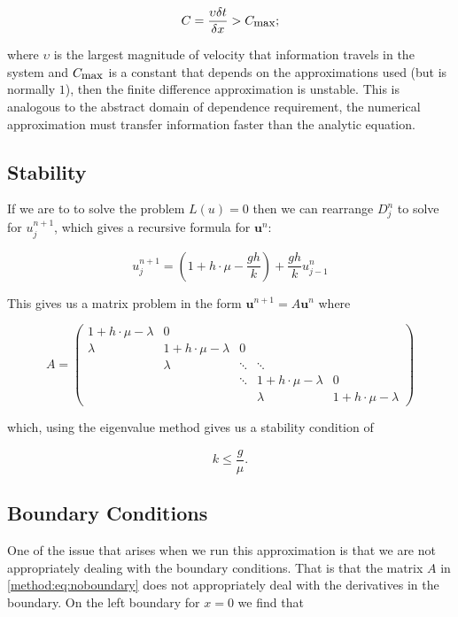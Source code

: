 \documentclass[../main]{subfiles}
\begin{document}
  \begin{equation}
    C = \frac{\upsilon \delta t}{\delta x} > C_{\mbox{\small max}};
  \end{equation}

  where $\upsilon$ is the largest magnitude of velocity that information travels in the system and $C_{\mbox{\small max}}$ is a constant that depends on the approximations used (but is normally $1$), then the finite difference approximation is unstable. This is analogous to the abstract domain of dependence requirement, the numerical approximation must transfer information faster than the analytic equation.

  \subsection{Stability}
  If we are to to solve the problem $L(u) = 0$ then we can rearrange $D^n_j$ to solve for $u^{n+1}_j$, which gives a recursive formula for $\mathbf{u}^n$:

  \begin{equation}
    u^{n+1}_j = \left(1 + h \cdot \mu - \frac{gh}{k} \right) + \frac{gh}{k} u^n_{j-1}
  \end{equation}

  This gives us a matrix problem in the form $\mathbf{u}^{n+1} = A \mathbf{u}^n$ where

  \begin{equation}\label{method:eq:noboundary}
    A = \begin{pmatrix}
      1 + h \cdot \mu - \lambda & 0 & \\
      \lambda & 1 + h \cdot \mu - \lambda & 0 \\
        & \lambda & \ddots & \ddots & \\
        &   & \ddots & 1 + h \cdot \mu - \lambda & 0 \\
        &   &        & \lambda & 1 + h \cdot \mu - \lambda
    \end{pmatrix}
  \end{equation}

  which, using the eigenvalue method gives us a stability condition of

  \begin{equation}
    k \leq \frac{g}{\mu}.
  \end{equation}

  \subsection{Boundary Conditions}
  One of the issue that arises when we run this approximation is that we are not appropriately dealing with the boundary conditions. That is that the matrix $A$ in \autoref{method:eq:noboundary} does not appropriately deal with the derivatives in the boundary. On the left boundary for $x = 0$ we find that
\end{document}
